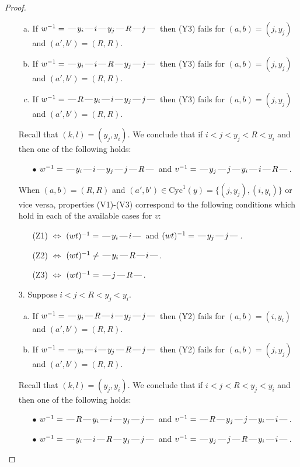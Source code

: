 \documentclass[10pt]{article}
\theoremstyle{definition}
\theoremstyle{definition}
\def\dash{\text{\hspace{0.5mm}---\hspace{0.5mm}}}
\def\Cyc{\mathrm{Cyc}}
\begin{document}
\begin{proof}
\begin{enumerate}
\begin{enumerate}[(a)]
\item If $w^{-1} = \dash y_i\dash i\dash y_j\dash R\dash j\dash $ then (Y3) fails for $(a,b)=(j,y_j)$ and $(a',b')=(R,R)$.
\item If $w^{-1} = \dash y_i\dash i\dash R\dash y_j\dash j\dash $ then (Y3) fails for $(a,b)=(j,y_j)$ and $(a',b')=(R,R)$.
\item If $w^{-1} = \dash R\dash y_i\dash i\dash y_j\dash j\dash $ then (Y3) fails for $(a,b)=(j,y_j)$ and $(a',b')=(R,R)$.
\end{enumerate}
Recall that $(k,l) = (y_j,y_i)$.
We conclude that if $i < j < y_j < R < y_i$ and then one of the following holds:
\begin{enumerate}
\item[$\bullet$] $w^{-1} = \dash y_i\dash i\dash y_j\dash j\dash R\dash $ and $v^{-1} = \dash y_j\dash j\dash y_i\dash i\dash R\dash $.
\end{enumerate}
When $(a,b)= (R, R)$ and $(a',b')\in \Cyc^1(y)=\{(j,y_j),(i,y_i)\}$ or vice versa,
properties (V1)-(V3) correspond to the following conditions which hold in
each of the available cases for $v$:
\begin{enumerate}
\item[](Z1) $\Leftrightarrow$ $(wt)^{-1} = \dash y_i \dash i \dash$  and $(wt)^{-1} = \dash y_j \dash j \dash$.
\item[](Z2) $\Leftrightarrow$ $(wt)^{-1} \neq \dash y_i \dash R \dash i \dash$.
\item[](Z3) $\Leftrightarrow$ $(wt)^{-1} = \dash j \dash R \dash$.
\end{enumerate}
\item[$3$.] Suppose $i < j < R < y_j < y_i$.
\begin{enumerate}[(a)]
\item If $w^{-1} = \dash y_i\dash R\dash i\dash y_j\dash j\dash $ then (Y2) fails for $(a,b)=(i,y_i)$ and $(a',b')=(R,R)$.
\item If $w^{-1} = \dash y_i\dash i\dash y_j\dash R\dash j\dash $ then (Y2) fails for $(a,b)=(j,y_j)$ and $(a',b')=(R,R)$.
\end{enumerate}
Recall that $(k,l) = (y_j,y_i)$.
We conclude that if $i < j < R < y_j < y_i$ and then one of the following holds:
\begin{enumerate}
\item[$\bullet$] $w^{-1} = \dash R\dash y_i\dash i\dash y_j\dash j\dash $ and $v^{-1} = \dash R\dash y_j\dash j\dash y_i\dash i\dash $.
\item[$\bullet$] $w^{-1} = \dash y_i\dash i\dash R\dash y_j\dash j\dash $ and $v^{-1} = \dash y_j\dash j\dash R\dash y_i\dash i\dash $.

\end{enumerate}
\end{enumerate}
\end{proof}
\end{document}
